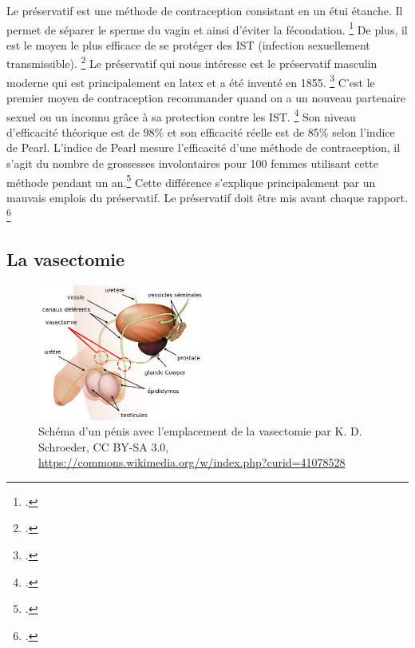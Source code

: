 \documentclass[12pt,a4paper]{report}
\begin{document}
Le préservatif est une méthode de contraception consistant en un étui étanche. Il permet de séparer le sperme du vagin et ainsi d'éviter la fécondation. \footcite{PreservatifWikipedia}
De plus, il est le moyen le plus efficace de se protéger des IST (infection sexuellement transmissible). \footcite{MaladiesInfectionsSexuellement}
Le préservatif qui nous intéresse est le préservatif masculin moderne qui est principalement en latex et a été inventé en 1855. \footcite{PreservatifWikipedia}
C'est le premier moyen de contraception recommander quand on a un nouveau partenaire sexuel ou un inconnu grâce à sa protection contre les IST. \footcite{PreventionIST}
Son niveau d'efficacité théorique est de 98\% et son efficacité réelle est de 85\% selon l'indice de Pearl. L'indice de Pearl mesure l'efficacité d'une méthode de contraception, il s'agit du nombre de grossesses involontaires pour 100 femmes utilisant cette méthode pendant un an.\footcite{EfficaciteMoyensContraceptifs}
Cette différence s'explique principalement par un mauvais emplois du préservatif.
Le préservatif doit être mis avant chaque rapport. \footcite{TousMoyensContraception2023} 

\subsection{La vasectomie}

\begin{figure}[!htb]
    \centering
    \includegraphics[width=0.5\textwidth]{images/scientiphique/Vasectomie_fr.svg.png}
    \caption{Schéma d'un pénis avec l'emplacement de la vasectomie par K. D. Schroeder, CC BY-SA 3.0, \href{https://commons.wikimedia.org/w/index.php?curid=41078528}{https://commons.wikimedia.org/w/index.php?curid=41078528}}
    \label{fig:vasectomie}
\end{figure}
\end{document}
